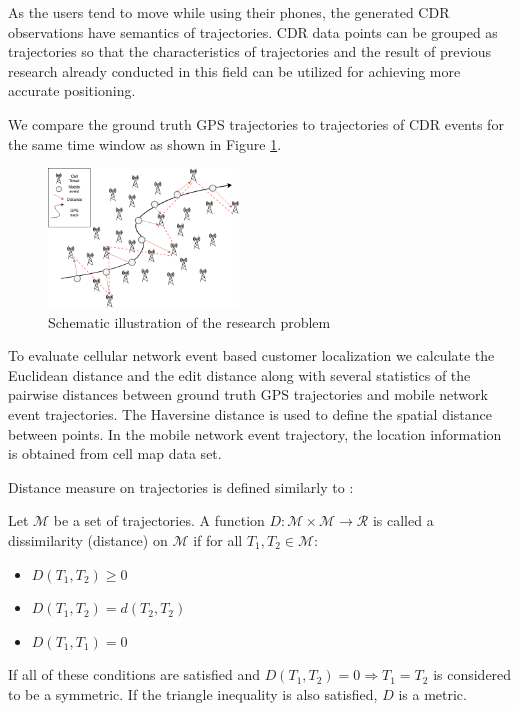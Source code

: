 As the users tend to move while using their phones, the generated CDR observations have semantics of trajectories. CDR data points can be grouped as trajectories so that the characteristics of trajectories and the result of previous research already conducted in this field can be utilized for achieving more accurate positioning.

We compare the ground truth GPS trajectories to trajectories of CDR events for the same time window as shown in Figure \ref{fig:problem}. 
\begin{figure}[h]
    \centering
    \includegraphics[width=0.45\textwidth]{images/problem.png}
    \caption{Schematic illustration of the research problem}
    \label{fig:problem}
\end{figure}

To evaluate cellular network event based customer localization we calculate the Euclidean distance and the edit distance along with several statistics of the pairwise distances between ground truth GPS trajectories and mobile network event trajectories. The Haversine distance is used to define the spatial distance between points. In the mobile network event trajectory, the location information is obtained from cell map data set.


Distance measure on trajectories is defined similarly to \cite{encyclopedia, distance-def}:
\begin{definition}
Let $\mathcal{M}$ be a set of trajectories. A function $D :\mathcal{M} \times \mathcal{M} \rightarrow \mathcal{R}$  is called a dissimilarity (distance) on $\mathcal{M}$ if for all $T_{1}, T_{2} \in \mathcal{M}$: 
\begin{itemize}
    \item $D(T_{1},T_{2}) \geqslant 0$
    \item $D(T_{1},T_{2}) = d(T_{2},T_{2})$
    \item $D(T_{1},T_{1}) = 0$
\end{itemize}
If all of these conditions are satisfied and $D(T_{1}, T_{2}) = 0 \Rightarrow  T_{1} = T_{2} $ is considered to be a symmetric. If
the triangle inequality is also satisfied, $D$ is a metric.
\end{definition}


